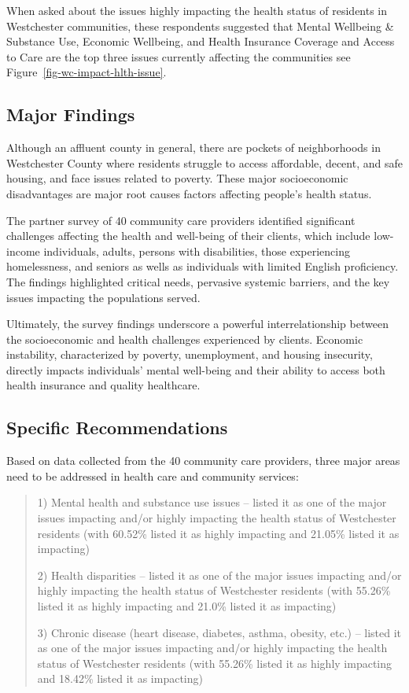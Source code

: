 \documentclass[
  english,
  letterpaper,
]{report}
\begin{document}
When asked about the issues highly impacting the health status of
residents in Westchester communities, these respondents suggested that
Mental Wellbeing \& Substance Use, Economic Wellbeing, and Health
Insurance Coverage and Access to Care are the top three issues currently
affecting the communities see Figure~\ref{fig-wc-impact-hlth-issue}.

\subsection{Major Findings}\label{major-findings-6}

Although an affluent county in general, there are pockets of
neighborhoods in Westchester County where residents struggle to access
affordable, decent, and safe housing, and face issues related to
poverty. These major socioeconomic disadvantages are major root causes
factors affecting people's health status.

The partner survey of 40 community care providers identified significant
challenges affecting the health and well-being of their clients, which
include low-income individuals, adults, persons with disabilities, those
experiencing homelessness, and seniors as wells as individuals with
limited English proficiency. The findings highlighted critical needs,
pervasive systemic barriers, and the key issues impacting the
populations served.

Ultimately, the survey findings underscore a powerful interrelationship
between the socioeconomic and health challenges experienced by clients.
Economic instability, characterized by poverty, unemployment, and
housing insecurity, directly impacts individuals' mental well-being and
their ability to access both health insurance and quality healthcare.

\subsection{Specific Recommendations}\label{specific-recommendations-5}

Based on data collected from the 40 community care providers, three
major areas need to be addressed in health care and community services:

\begin{quote}
1) Mental health and substance use issues -- listed it as one of the
major issues impacting and/or highly impacting the health status of
Westchester residents (with 60.52\% listed it as highly impacting and
21.05\% listed it as impacting)

2) Health disparities -- listed it as one of the major issues impacting
and/or highly impacting the health status of Westchester residents (with
55.26\% listed it as highly impacting and 21.0\% listed it as impacting)

3) Chronic disease (heart disease, diabetes, asthma, obesity, etc.) --
listed it as one of the major issues impacting and/or highly impacting
the health status of Westchester residents (with 55.26\% listed it as
highly impacting and 18.42\% listed it as impacting)
\end{quote}
\end{document}
